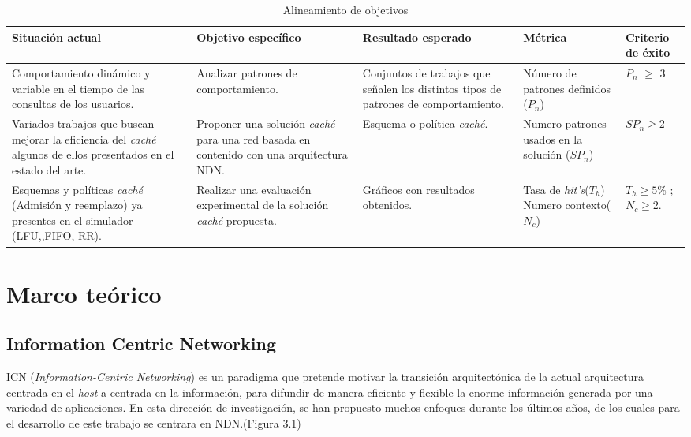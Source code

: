 \documentclass[12pt]{ociamthesis}  %
\begin{document}
\begin{table}[H]
	
	\begin{tabular}{|p{3cm}|p{3cm}|p{3cm}|p{3cm}|p{2cm}|}
		\hline
		\textbf{Situación actual} & \textbf{Objetivo específico} & \textbf{Resultado esperado} & \textbf{Métrica} & \textbf{Criterio de éxito}\\ \hline
		Comportamiento dinámico y variable en el tiempo de las consultas de los usuarios. & Analizar patrones de comportamiento. & Conjuntos de trabajos que señalen los distintos tipos de patrones de comportamiento. & Número de patrones definidos ($P_n$) & $P_n$ $\geq$ 3\\ \hline
		
		Variados trabajos que buscan mejorar la eficiencia del \textit{caché} algunos de ellos presentados en el estado del arte. & Proponer una solución \textit{caché} para una red basada en contenido con una arquitectura NDN. & Esquema o política \textit{caché}. & Numero patrones usados en la solución ($SP_n$) & $SP_n \geq 2$\\ \hline
		
		Esquemas y políticas \textit{caché} (Admisión y reemplazo) ya presentes en el simulador (LFU,,FIFO, RR). & Realizar una evaluación experimental de la solución \textit{caché} propuesta. & Gráficos con resultados obtenidos. & Tasa de \textit{hit's}($T_h$) Numero contexto($N_c$) &  $T_h \geq 5\%$ ; $N_c \geq 2$. \\ \hline
		
	\end{tabular}
	\caption{Alineamiento de objetivos}
	\label{Tabla_alineamiento}
\end{table}

\chapter{Marco teórico}

\section{Information Centric Networking}
ICN (\textit{Information-Centric Networking}) es un paradigma que pretende motivar la transición arquitectónica de la actual arquitectura centrada en el \textit{host} a centrada en la información, para difundir de manera eficiente y flexible la enorme información generada por una variedad de aplicaciones. En esta dirección de investigación, se han propuesto muchos enfoques durante los últimos años, de los cuales para el desarrollo de este trabajo se centrara en NDN.(Figura 3.1)\hfill
\end{document}
